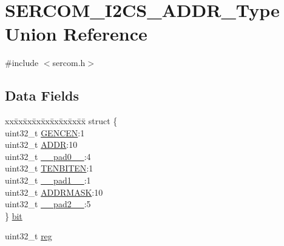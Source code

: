 \hypertarget{union_s_e_r_c_o_m___i2_c_s___a_d_d_r___type}{}\section{S\+E\+R\+C\+O\+M\+\_\+\+I2\+C\+S\+\_\+\+A\+D\+D\+R\+\_\+\+Type Union Reference}
\label{union_s_e_r_c_o_m___i2_c_s___a_d_d_r___type}


{\ttfamily \#include $<$sercom.\+h$>$}

\subsection*{Data Fields}
\begin{DoxyCompactItemize}
\item 
\begin{tabbing}
xx\=xx\=xx\=xx\=xx\=xx\=xx\=xx\=xx\=\kill
struct \{\\
\>uint32\_t \mbox{\hyperlink{union_s_e_r_c_o_m___i2_c_s___a_d_d_r___type_aaf6e2f38f3115f0928f5dfee8a1eec39}{GENCEN}}:1\\
\>uint32\_t \mbox{\hyperlink{union_s_e_r_c_o_m___i2_c_s___a_d_d_r___type_ac9f49eaa00ec245d66e5342c02bcce9f}{ADDR}}:10\\
\>uint32\_t \mbox{\hyperlink{union_s_e_r_c_o_m___i2_c_s___a_d_d_r___type_a3e57c2ef1c3ffb36722f000cc1156824}{\_\_pad0\_\_}}:4\\
\>uint32\_t \mbox{\hyperlink{union_s_e_r_c_o_m___i2_c_s___a_d_d_r___type_a7facace59b31af2385d081975411ce42}{TENBITEN}}:1\\
\>uint32\_t \mbox{\hyperlink{union_s_e_r_c_o_m___i2_c_s___a_d_d_r___type_a6712ba6dd1d5b43d2d56ff8ac4e275a7}{\_\_pad1\_\_}}:1\\
\>uint32\_t \mbox{\hyperlink{union_s_e_r_c_o_m___i2_c_s___a_d_d_r___type_a475adb7db2ff7161b68651e8aba62bad}{ADDRMASK}}:10\\
\>uint32\_t \mbox{\hyperlink{union_s_e_r_c_o_m___i2_c_s___a_d_d_r___type_a9ce12a63de64ef64ae2d59d128251cae}{\_\_pad2\_\_}}:5\\
\} \mbox{\hyperlink{union_s_e_r_c_o_m___i2_c_s___a_d_d_r___type_aecdab644d128ccd87aa1e1273c853d1d}{bit}}\\

\end{tabbing}\item 
uint32\+\_\+t \mbox{\hyperlink{union_s_e_r_c_o_m___i2_c_s___a_d_d_r___type_a6b91636401516a477989a336376d7b40}{reg}}
\end{DoxyCompactItemize}


